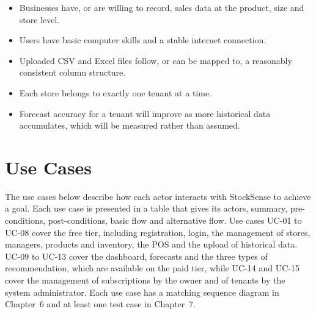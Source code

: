 \documentclass{StockSense}
\begin{document}
\begin{itemize}
    \item Businesses have, or are willing to record, sales data at the product, size and store level.
    \item Users have basic computer skills and a stable internet connection.
    \item Uploaded CSV and Excel files follow, or can be mapped to, a reasonably consistent column structure.
    \item Each store belongs to exactly one tenant at a time.
    \item Forecast accuracy for a tenant will improve as more historical data accumulates, which will be measured rather than assumed.
\end{itemize}

\section{Use Cases}

The use cases below describe how each actor interacts with StockSense to achieve a goal. Each use case is presented in a table that gives its actors, summary, pre-conditions, post-conditions, basic flow and alternative flow. Use cases UC-01 to UC-08 cover the free tier, including registration, login, the management of stores, managers, products and inventory, the POS and the upload of historical data. UC-09 to UC-13 cover the dashboard, forecasts and the three types of recommendation, which are available on the paid tier, while UC-14 and UC-15 cover the management of subscriptions by the owner and of tenants by the system administrator. Each use case has a matching sequence diagram in Chapter~6 and at least one test case in Chapter~7.
\end{document}
